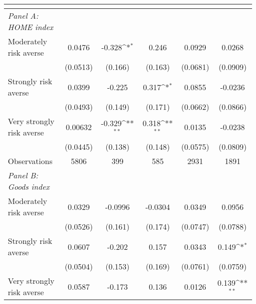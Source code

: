 {
\def\sym#1{\ifmmode^{#1}\else\(^{#1}\)\fi}
\begin{tabular}{l*{5}{c}}
\toprule
                    &&&&&\\
\midrule
\textit{Panel A: HOME index} & & & & & \\
Moderately risk averse&      0.0476         &      -0.328\sym{*}  &       0.246         &      0.0929         &      0.0268         \\
                    &    (0.0513)         &     (0.166)         &     (0.163)         &    (0.0681)         &    (0.0909)         \\
Strongly risk averse&      0.0399         &      -0.225         &       0.317\sym{*}  &      0.0855         &     -0.0236         \\
                    &    (0.0493)         &     (0.149)         &     (0.171)         &    (0.0662)         &    (0.0866)         \\
Very strongly risk averse&     0.00632         &      -0.329\sym{**} &       0.318\sym{**} &      0.0135         &     -0.0238         \\
                    &    (0.0445)         &     (0.138)         &     (0.148)         &    (0.0575)         &    (0.0809)         \\
\midrule
Observations        &        5806         &         399         &         585         &        2931         &        1891         \\
\midrule
\textit{Panel B: Goods index} & & & & & \\
Moderately risk averse&      0.0329         &     -0.0996         &     -0.0304         &      0.0349         &      0.0956         \\
                    &    (0.0526)         &     (0.161)         &     (0.174)         &    (0.0747)         &    (0.0788)         \\
Strongly risk averse&      0.0607         &      -0.202         &       0.157         &      0.0343         &       0.149\sym{*}  \\
                    &    (0.0504)         &     (0.153)         &     (0.169)         &    (0.0761) & (0.0759)\\        
Very strongly risk averse&      0.0587         &      -0.173         &       0.136         &      0.0126         &       0.139\sym{**} \\

\end{tabular}}
